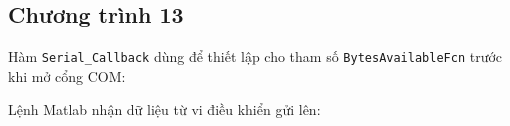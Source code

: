 \subsection*{Chương trình 13}


Hàm \verb|Serial_Callback| dùng để thiết lập cho tham số \verb|BytesAvailableFcn| trước khi mở cổng COM:


Lệnh Matlab nhận dữ liệu từ vi điều khiển gửi lên:
